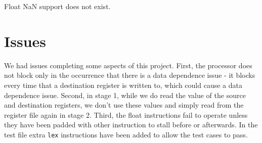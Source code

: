 \documentclass{sig-alternate-05-2015}
\begin{document}
Float NaN support does not exist.

\section{Issues}

We had issues completing some aspects of this project. First, the processor does not block only in the occurrence that there is a data dependence issue - it blocks every time that a destination register is written to, which could cause a data dependence issue. Second, in stage 1, while we do read the value of the source and destination registers, we don't use these values and simply read from the register file again in stage 2. Third, the float instructions fail to operate unless they have been padded with other instruction to stall before or afterwards. In the test file extra \texttt{lex} instructions have been added to allow the test cases to pass.
\end{document}
